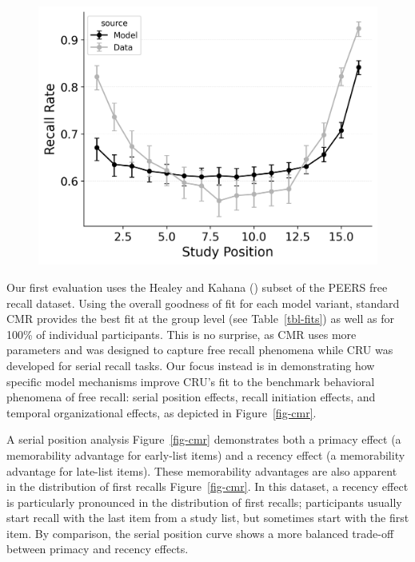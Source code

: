 \documentclass[
  man,
  floatsintext,
  longtable,
  nolmodern,
  notxfonts,
  notimes,
  draftfirst,
  colorlinks=true,linkcolor=blue,citecolor=blue,urlcolor=blue]{apa7}
\begin{document}
\begin{figure}
%
\begin{minipage}{0.33\linewidth}
\includegraphics{figures/bw_HealeyKahana2014_BaseCMR_Fitting_spc.png}\end{minipage}%

\end{figure}%

Our first evaluation uses the Healey and Kahana
() subset of the PEERS free recall
dataset. Using the overall goodness of fit for each model variant,
standard CMR provides the best fit at the group level (see
Table~\ref{tbl-fits}) as well as for 100\% of individual participants.
This is no surprise, as CMR uses more parameters and was designed to
capture free recall phenomena while CRU was developed for serial recall
tasks. Our focus instead is in demonstrating how specific model
mechanisms improve CRU's fit to the benchmark behavioral phenomena of
free recall: serial position effects, recall initiation effects, and
temporal organizational effects, as depicted in Figure~\ref{fig-cmr}.

A serial position analysis Figure~\ref{fig-cmr} demonstrates both a
primacy effect (a memorability advantage for early-list items) and a
recency effect (a memorability advantage for late-list items). These
memorability advantages are also apparent in the distribution of first
recalls Figure~\ref{fig-cmr}. In this dataset, a recency effect is
particularly pronounced in the distribution of first recalls;
participants usually start recall with the last item from a study list,
but sometimes start with the first item. By comparison, the serial
position curve shows a more balanced trade-off between primacy and
recency effects.
\end{document}
